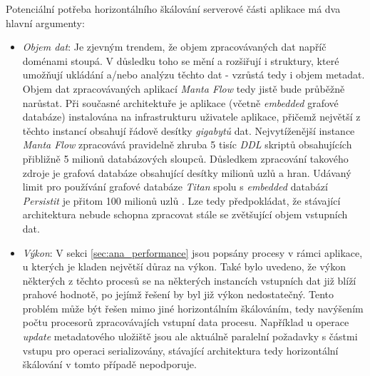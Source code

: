 Potenciální potřeba horizontálního škálování serverové části aplikace má dva hlavní argumenty:

\begin{itemize}
	\item{\textit{Objem dat}}: Je zjevným trendem, že objem zpracovávaných dat napříč doménami stoupá. V důsledku toho se mění a rozšiřují i struktury, které umožňují ukládání a/nebo analýzu těchto dat - vzrůstá tedy i objem metadat. Objem dat zpracovávaných aplikací \textit{Manta Flow} tedy jistě bude průběžně narůstat. Při současné architektuře je aplikace (včetně \textit{embedded} grafové databáze) instalována na infrastrukturu uživatele aplikace, přičemž největší z těchto instancí obsahují řádově desítky \textit{gigabytů} dat. Nejvytíženější instance \textit{Manta Flow} zpracovává pravidelně zhruba 5 tisíc \textit{DDL} skriptů obsahujících přibližně 5 milionů databázových sloupců. Důsledkem zpracování takového zdroje je grafová databáze obsahující desítky milionů uzlů a hran. Udávaný limit pro používání grafové databáze \textit{Titan} spolu s \textit{embedded} databází \textit{Persistit} je přitom 100 milionů uzlů \cite{TitanPersistit04}. Lze tedy předpokládat, že stávající architektura nebude schopna zpracovat stále se zvětšující objem vstupních dat.

	\item{\textit{Výkon}}: V sekci \ref{sec:ana_performance} jsou popsány procesy v rámci aplikace, u kterých je kladen největší důraz na výkon. Také bylo uvedeno, že výkon některých z těchto procesů se na některých instancích vstupních dat již blíží prahové hodnotě, po jejímž řešení by byl již výkon nedostatečný. Tento problém může být řešen mimo jiné horizontálním škálováním, tedy navýšením počtu procesorů zpracovávajích vstupní data procesu. Například u operace \textit{update} metadatového uložiště jsou ale aktuálně paralelní požadavky s částmi vstupu pro operaci serializovány, stávající architektura tedy horizontální škálování v tomto případě nepodporuje.
\end{itemize}


